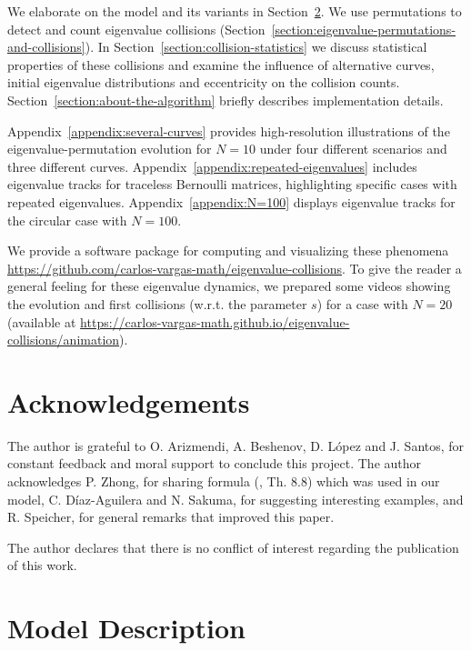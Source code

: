 \documentclass{article}
\begin{document}
	We elaborate on the model and its variants in Section~\ref{section:model-description}. 
	We use permutations to detect and count eigenvalue collisions 
	(Section~\ref{section:eigenvalue-permutations-and-collisions}). 
	In Section~\ref{section:collision-statistics} we discuss statistical properties of these collisions 
	and examine the influence of alternative curves,
	initial eigenvalue distributions and eccentricity on the collision counts. 
	Section~\ref{section:about-the-algorithm} briefly describes implementation details.

	Appendix~\ref{appendix:several-curves} 
	provides high-resolution illustrations of the eigenvalue-permutation evolution 
	for $N=10$ under four different scenarios and three different curves.
	Appendix~\ref{appendix:repeated-eigenvalues} includes eigenvalue tracks for traceless Bernoulli matrices, 
	highlighting specific cases with repeated eigenvalues.
	Appendix~\ref{appendix:N=100} displays eigenvalue tracks for the circular case with $N=100$.

	We provide a software package for computing and visualizing these phenomena
	\url{https://github.com/carlos-vargas-math/eigenvalue-collisions}.
	To give the reader a general feeling for these eigenvalue dynamics, 
	we prepared some videos showing the evolution and first collisions 
	(w.r.t. the parameter $s$)
	for a case with $N=20$ (available at 
	\url{https://carlos-vargas-math.github.io/eigenvalue-collisions/animation}).

	\section{Acknowledgements}

	The author is grateful to O. Arizmendi, A. Beshenov, D. L\'opez and J. Santos, 
	for constant feedback and moral support to conclude this project.	
	The author acknowledges P. Zhong, for sharing formula (\cite{Zhong-2022}, Th. 8.8)
	which was used in our model, C. D\'iaz-Aguilera and N. Sakuma, 
	for suggesting interesting examples, 
	and R. Speicher, for general remarks that improved this paper. 
	
	The author declares that there is no conflict of interest regarding the publication of this work.

	\section{Model Description} \label{section:model-description}
  
\end{document}
